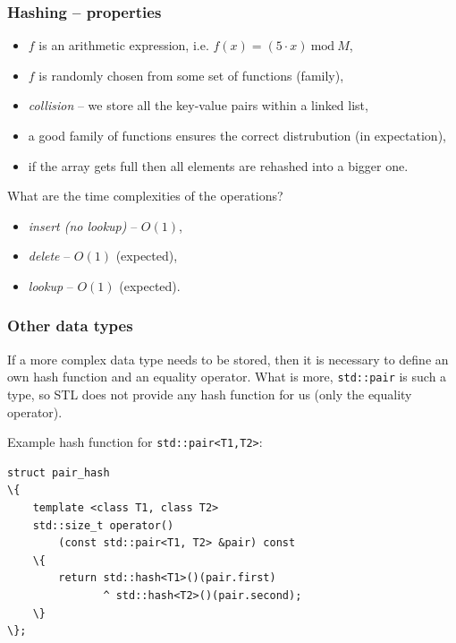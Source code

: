 \documentclass{beamer}
\begin{document}
\begin{frame}
    \frametitle{Hashing -- properties}
    \begin{itemize}
        \item $f$ is an arithmetic expression,
            i.e. $f(x) = (5 \cdot x)\ \mathrm{mod}\ M$, \pause
        \item $f$ is randomly chosen from some set of functions
            (family), \pause
        \item \textit{collision} -- we store all the key-value pairs within
            a linked list, \pause
        \item a good family of functions ensures the correct distrubution
            (in expectation), \pause
        \item if the array gets full then all elements are rehashed into
            a bigger one. \pause
    \end{itemize}

    What are the time complexities of the operations?
    \begin{itemize}
        \item \textit{insert (no lookup)} -- \pause $O(1)$, \pause
        \item \textit{delete} -- \pause $O(1)$ (expected), \pause
        \item \textit{lookup} -- \pause $O(1)$ (expected).
    \end{itemize}
\end{frame}

\begin{frame}[fragile]
    \frametitle{Other data types}

    If a more complex data type needs to be stored, then it is necessary
    to define an own hash function and an equality operator. \pause What is more,
    \texttt{std::pair} is such a type, so STL does not provide any hash function
    for us (only the equality operator). \pause

    Example hash function for \texttt{std::pair<T1,T2>}:
    \begin{Verbatim}[commandchars=\\\{\},fontsize=\small]
struct pair_hash
\{
    template <class T1, class T2>
    std::size_t operator()
        (const std::pair<T1, T2> &pair) const
    \{
        return std::hash<T1>()(pair.first)
               ^ std::hash<T2>()(pair.second);
    \}
\};
\end{Verbatim}
\end{frame}
\end{document}
